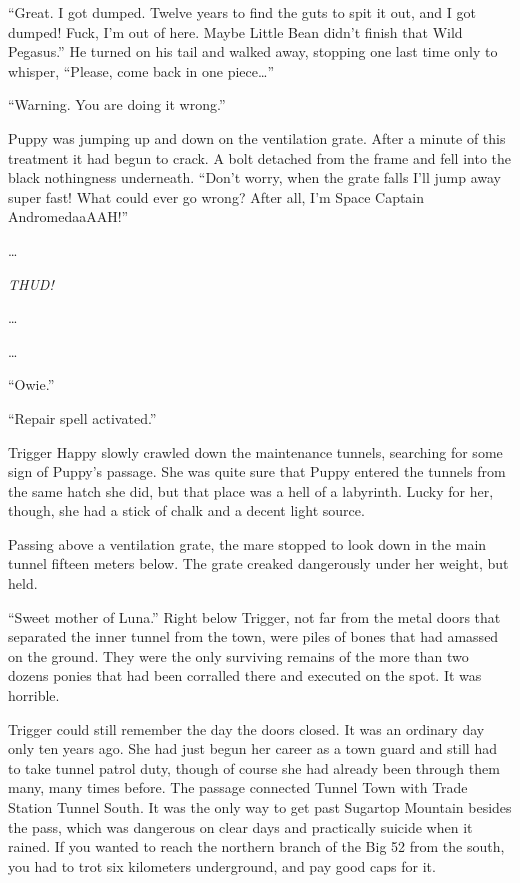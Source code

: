 ``Great. I got dumped. Twelve years to find the guts to spit it out, and I got dumped! Fuck, I'm out of here. Maybe Little Bean didn't finish that Wild Pegasus.'' He turned on his tail and walked away, stopping one last time only to whisper, ``Please, come back in one piece\dots''


\horizonline


{\mten ``Warning. You are doing it wrong.''}

Puppy was jumping up and down on the ventilation grate. After a minute of this treatment it had begun to crack. A bolt detached from the frame and fell into the black nothingness underneath. ``Don't worry, when the grate falls I'll jump away super fast! What could ever go wrong? After all, I'm Space Captain AndromedaaAAH!''

\dots

\emph{THUD!}

\dots

\dots

``Owie.''

{\mten ``Repair spell activated.''}


\horizonline


Trigger Happy slowly crawled down the maintenance tunnels, searching for some sign of Puppy's passage. She was quite sure that Puppy entered the tunnels from the same hatch she did, but that place was a hell of a labyrinth. Lucky for her, though, she had a stick of chalk and a decent light source.

Passing above a ventilation grate, the mare stopped to look down in the main tunnel fifteen meters below. The grate creaked dangerously under her weight, but held.

``Sweet mother of Luna.'' Right below Trigger, not far from the metal doors that separated the inner tunnel from the town, were piles of bones that had amassed on the ground. They were the only surviving remains of the more than two dozens ponies that had been corralled there and executed on the spot. It was horrible.

Trigger could still remember the day the doors closed. It was an ordinary day only ten years ago. She had just begun her career as a town guard and still had to take tunnel patrol duty, though of course she had already been through them many, many times before. The passage connected Tunnel Town with Trade Station Tunnel South. It was the only way to get past Sugartop Mountain besides the pass, which was dangerous on clear days and practically suicide when it rained. If you wanted to reach the northern branch of the Big 52 from the south, you had to trot six kilometers underground, and pay good caps for it.

